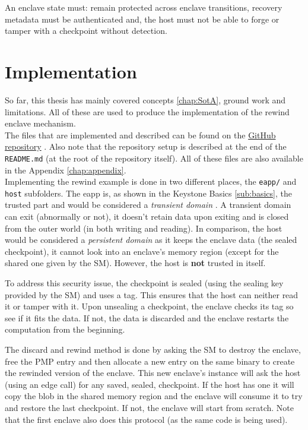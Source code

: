 \documentclass[11pt,a4paper]{report}
\newcommand{\github}{%
    \href{https://github.com/ldevroye/keystone/tree/master}{GitHub repository}
}
\begin{document}
An enclave state must: remain protected across enclave transitions, recovery metadata must be authenticated and, the host must not be able to forge or tamper with a checkpoint without detection.



\section{Implementation}
So far, this thesis has mainly covered concepts \ref{chap:SotA}, ground work \cite{ARM-TrustZone-CortexM, sdrad, keystone-repo} and limitations.
All of these are used to produce the implementation of the rewind enclave mechanism.
\\

The files that are implemented and described can be found on the \github.
Also note that the repository setup is described at the end of the \verb|README.md| (at the root of the repository itself).
All of these files are also available in the Appendix \ref{chap:appendix}. 
\\

Implementing the rewind example is done in two different places, the \verb|eapp/| and \verb|host| subfolders.
The eapp is, as shown in the Keystone Basics \ref{sub:basics}, the trusted part and would be considered a \textit{transient domain} \cite{sdrad}.
A transient domain can exit (abnormally or not), it doesn't retain data upon exiting and is closed from the outer world (in both writing and reading).
In comparison, the host would be considered a \textit{persistent domain} as it keeps the enclave data (the sealed checkpoint), it cannot look into an enclave's memory region (except for the shared one given by the SM).
However, the host is \textbf{not} trusted in itself.

To address this security issue, the checkpoint is sealed (using the sealing key provided by the SM) and uses a tag. 
This ensures that the host can neither read it or tamper with it.
Upon unsealing a checkpoint, the enclave checks its tag so see if it fits the data. 
If not, the  data is discarded and the enclave restarts the computation from the beginning.

The discard and rewind method is done by asking the SM to destroy the enclave, free the PMP entry and then allocate a new entry on the same binary to create the rewinded version of the enclave.
This new enclave's instance will ask the host (using an edge call) for any saved, sealed, checkpoint. 
If the host has one it will copy the blob in the shared memory region and the enclave will consume it to try and restore the last checkpoint.
If not, the enclave will start from scratch.
Note that the first enclave also does this protocol (as the same code is being used).
\end{document}

